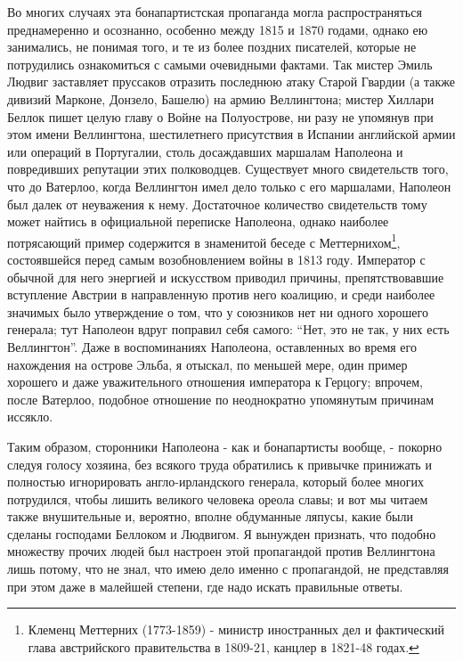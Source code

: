 \documentclass[
  oneside,
  12pt,
  titlepage]{book}
\begin{document}
Во многих случаях эта бонапартистская пропаганда могла распространяться преднамеренно и осознанно, особенно между 1815 и 1870 годами, однако ею занимались, не понимая того, и те из более поздних писателей, которые не потрудились ознакомиться с самыми очевидными фактами. Так мистер Эмиль Людвиг заставляет пруссаков отразить последнюю атаку Старой Гвардии (а также дивизий Марконе, Донзело, Башелю) на армию Веллингтона; мистер Хиллари Беллок пишет целую главу о Войне на Полуострове, ни разу не упомянув при этом имени Веллингтона, шестилетнего присутствия в Испании английской армии или операций в Португалии, столь досаждавших маршалам Наполеона и повредивших репутации этих полководцев. Существует много свидетельств того, что до Ватерлоо, когда Веллингтон имел дело только с его маршалами, Наполеон был далек от неуважения к нему. Достаточное количество свидетельств тому может найтись в официальной переписке Наполеона, однако наиболее потрясающий пример содержится в знаменитой беседе с Меттернихом\footnote{Клеменц Меттерних (1773-1859) - министр иностранных дел и фактический глава австрийского правительства в 1809-21, канцлер в 1821-48 годах.}, состоявшейся перед самым возобновлением войны в 1813 году. Император с обычной для него энергией и искусством приводил причины, препятствовавшие вступление Австрии в направленную против него коалицию, и среди наиболее значимых было утверждение о том, что у союзников нет ни одного хорошего генерала; тут Наполеон вдруг поправил себя самого: ``Нет, это не так, у них есть Веллингтон''. Даже в воспоминаниях Наполеона, оставленных во время его нахождения на острове Эльба, я отыскал, по меньшей мере, один пример хорошего и даже уважительного отношения императора к Герцогу; впрочем, после Ватерлоо, подобное отношение по неоднократно упомянутым причинам иссякло.

Таким образом, сторонники Наполеона - как и бонапартисты вообще, - покорно следуя голосу хозяина, без всякого труда обратились к привычке принижать и полностью игнорировать англо-ирландского генерала, который более многих потрудился, чтобы лишить великого человека ореола славы; и вот мы читаем также внушительные и, вероятно, вполне обдуманные ляпусы, какие были сделаны господами Беллоком и Людвигом. Я вынужден признать, что подобно множеству прочих людей был настроен этой пропагандой против Веллингтона лишь потому, что не знал, что имею дело именно с пропагандой, не представляя при этом даже в малейшей степени, где надо искать правильные ответы.
\end{document}
